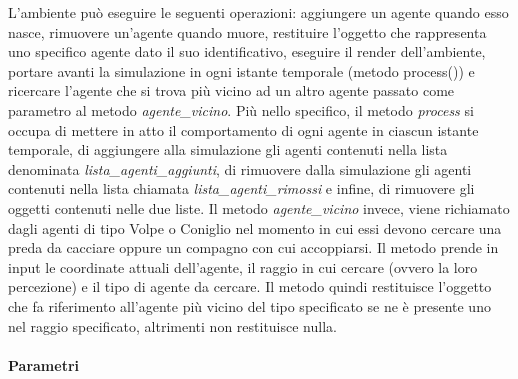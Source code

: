 \documentclass[11pt]{article}
\begin{document}
L'ambiente può eseguire le seguenti operazioni: aggiungere un agente quando esso nasce, rimuovere un'agente quando muore, restituire l'oggetto che rappresenta uno specifico agente dato il suo identificativo, eseguire il render dell'ambiente, portare avanti la simulazione in ogni istante temporale (metodo process()) e ricercare l'agente che si trova più vicino ad un altro agente passato come parametro al metodo \emph{agente\_vicino}. 
Più nello specifico, il metodo \emph{process} si occupa di mettere in atto il comportamento di ogni agente in ciascun istante temporale, di aggiungere alla simulazione gli agenti contenuti nella lista denominata \emph{lista\_agenti\_aggiunti}, di rimuovere dalla simulazione gli agenti contenuti nella lista chiamata \emph{lista\_agenti\_rimossi} e infine, di rimuovere gli oggetti contenuti nelle due liste. Il metodo \emph{agente\_vicino} invece, viene richiamato dagli agenti di tipo Volpe o Coniglio nel momento in cui essi devono cercare una preda da cacciare oppure un compagno con cui accoppiarsi. Il metodo prende in input le coordinate attuali dell'agente, il raggio in cui cercare (ovvero la loro percezione) e il tipo di agente da cercare. Il metodo quindi restituisce l'oggetto che fa riferimento all'agente più vicino del tipo specificato se ne è presente uno nel raggio specificato, altrimenti non restituisce nulla.    
\paragraph{Parametri}
\end{document}
